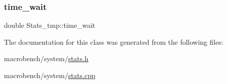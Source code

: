 \subsubsection{\texorpdfstring{time\+\_\+wait}{time\_wait}}
{\footnotesize\ttfamily double Stats\+\_\+tmp\+::time\+\_\+wait}



The documentation for this class was generated from the following files\+:\begin{DoxyCompactItemize}
\item 
macrobench/system/\hyperlink{stats_8h}{stats.\+h}\item 
macrobench/system/\hyperlink{stats_8cpp}{stats.\+cpp}\end{DoxyCompactItemize}
